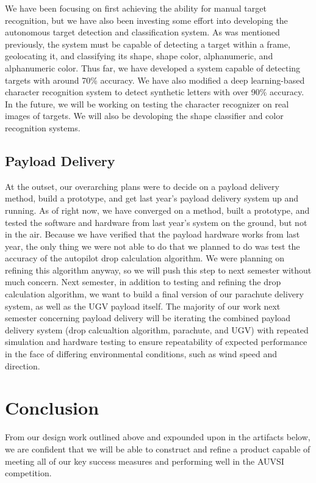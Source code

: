 \documentclass[]{auvsi_doc}
\begin{document}
We have been focusing on first achieving the ability for manual target recognition, but we have also been investing some effort into developing
the autonomous target detection and classification system. As was mentioned previously, the system must be capable of detecting a target
within a frame, geolocating it, and classifying its shape, shape color, alphanumeric, and alphanumeric color. Thus far, we have developed a
system capable of detecting targets with around 70\% accuracy. We have also modified a deep learning-based character recognition system
to detect synthetic letters with over 90\% accuracy. In the future, we will be working on testing the character recognizer on
real images of targets. We will also be devoloping the shape classifier and color recognition systems.
\subsection{Payload Delivery}
At the outset, our overarching plans were to decide on a payload delivery method, build a prototype, and get last year's payload delivery system up and running. As of right now, we have converged on a method, built a prototype, and tested the software and hardware from last year's system on the ground, but not in the air. Because we have verified that the payload hardware works from last year, the only thing we were not able to do that we planned to do was test the accuracy of the autopilot drop calculation algorithm. We were planning on refining this algorithm anyway, so we will push this step to next semester without much concern.
Next semester, in addition to testing and refining the drop calculation algorithm, we want to build a final version of our parachute delivery system, as well as the UGV payload itself. The majority of our work next semester concerning payload delivery will be iterating the combined payload delivery system (drop calcualtion algorithm, parachute, and UGV) with repeated simulation and hardware testing to ensure repeatability of expected performance in the face of differing environmental conditions, such as wind speed and direction.
\section{Conclusion}
From our design work outlined above and expounded upon in the artifacts below, we are confident that we will be able to construct and refine a product capable of meeting all of our key success measures and performing well in the AUVSI competition.
\end{document}
